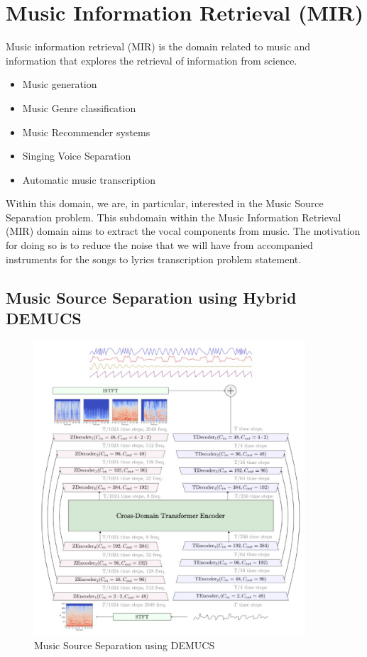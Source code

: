 \section{Music Information Retrieval (MIR)}%
\label{sec:musicinformationretrieval}

Music information retrieval (MIR) is the domain related to music and information that explores the retrieval of information from science.

\begin{itemize}
    \item Music generation
    \item Music Genre classification
    \item Music Recommender systems
    \item Singing Voice Separation 
    \item Automatic music transcription
    
\end{itemize}

Within this domain, we are, in particular, interested in the Music Source Separation problem. This subdomain within the Music Information Retrieval (MIR) domain aims to extract the vocal components from music. The motivation for doing so is to reduce the noise that we will have from accompanied instruments for the songs to lyrics transcription problem statement. 

\subsection{Music Source Separation using Hybrid DEMUCS}%
\label{sec:demucs}

\begin{figure} [H]
    \centering
    \includegraphics[width=0.9\textwidth]{03-Theoretical Foundations/figures/demucs.pdf}
    \caption{Music Source Separation using DEMUCS}
    \label{fig:demucs}
\end{figure}


